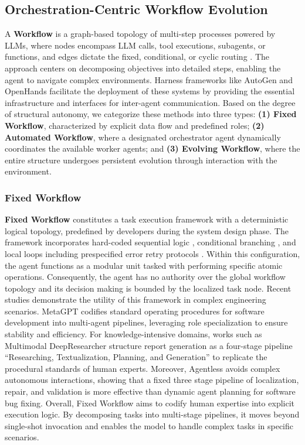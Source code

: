 \subsection{Orchestration-Centric Workflow Evolution}
\label{sec:agent_evo_agentic_workflow_design}
A \textbf{Workflow} is a graph-based topology of multi-step processes powered by LLMs, where nodes encompass LLM calls, tool executions, subagents, or functions, and edges dictate the fixed, conditional, or cyclic routing \cite{ToT,ReAct,ReWoo,Self-Refine,LLM+P}. The approach centers on decomposing objectives into detailed steps, enabling the agent to navigate complex environments. Harness frameworks like AutoGen  \cite{autogen} and OpenHands \cite{OpenHands} facilitate the deployment of these systems by providing the essential infrastructure and interfaces for inter-agent communication. Based on the degree of structural autonomy, we categorize these methods into three types: \textbf{(1) Fixed Workflow}, characterized by explicit data flow and predefined roles; \textbf{(2) Automated Workflow}, where a designated orchestrator agent dynamically coordinates the available worker agents; and \textbf{(3) Evolving Workflow}, where the entire structure undergoes persistent evolution through interaction with the environment.

\subsubsection{Fixed Workflow}
\label{sec:fixed_workflow}
\textbf{Fixed Workflow} constitutes a task execution framework with a deterministic logical topology, predefined by developers during the system design phase. The framework incorporates hard-coded sequential logic \cite{Explorer, Simulate_Before_Act}, conditional branching \cite{CodeR, VideoAgent}, and local loops including prespecified error retry protocols \cite{LVAgent, QuantAgent}. Within this configuration, the agent functions as a modular unit tasked with performing specific atomic operations. Consequently, the agent has no authority over the global workflow topology and its decision making is bounded by the localized task node. Recent studies demonstrate the utility of this framework in complex engineering scenarios. MetaGPT \cite{METAGPT} codifies standard operating procedures for software development into multi-agent pipelines, leveraging role specialization to ensure stability and efficiency. For knowledge-intensive domains, works such as Multimodal DeepResearcher \cite{Multimodal_DeepResearcher} structure report generation as a four-stage pipeline ``Researching, Textualization, Planning, and Generation'' to replicate the procedural standards of human experts. Moreover, Agentless \cite{Agentless} avoids complex autonomous interactions, showing that a fixed three stage pipeline of localization, repair, and validation is more effective than dynamic agent planning for software bug fixing. Overall, Fixed Workflow aims to codify human expertise into explicit execution logic. By decomposing tasks into multi-stage pipelines, it moves beyond single-shot invocation and enables the model to handle complex tasks in specific scenarios.

